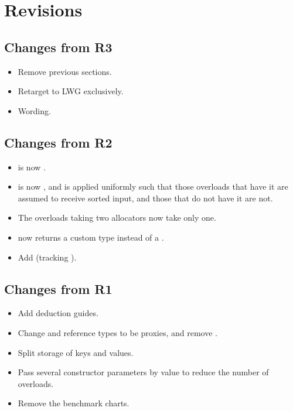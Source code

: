 \section{Revisions}

\subsection{Changes from R3}

\begin{itemize}
  \item Remove previous sections.
  \item Retarget to LWG exclusively.
  \item Wording.
\end{itemize}

\subsection{Changes from R2}

\begin{itemize}
  \item {} is now .
  \item {} is now , and
    is applied uniformly such that those overloads that have it are assumed to
    receive sorted input, and those that do not have it are not.
  \item The overloads taking two allocators now take only one.
  \item {} now returns a custom type instead of a .
  \item Add  (tracking ).
\end{itemize}

\subsection{Changes from R1}

\begin{itemize}
  \item Add deduction guides.
  \item Change  and reference types to be proxies, and remove
    .
  \item Split storage of keys and values.
  \item Pass several constructor parameters by value to reduce the number of overloads.
  \item Remove the benchmark charts.
\end{itemize}

